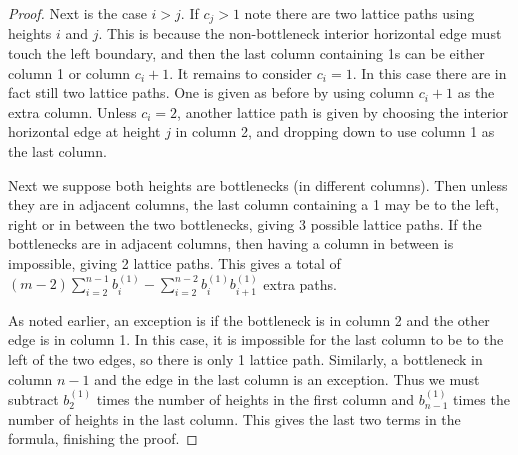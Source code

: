 \documentclass[12pt]{amsart}
\theoremstyle{definition}
\begin{document}
\begin{proof}
Next is the case $i>j$. If $c_j > 1$ note there are two lattice paths using heights $i$ and $j$. This is because the non-bottleneck interior horizontal edge must touch the left boundary, and then the last column containing 1s can be either column 1 or column $c_i+1$. It remains to consider $c_i=1$. In this case there are in fact still two lattice paths. One is given as before by using column $c_i+1$ as the extra column. Unless $c_i=2$, another lattice path is given by choosing the interior horizontal edge at height $j$ in column 2, and dropping down to use column 1 as the last column.

Next we suppose both heights are bottlenecks (in different columns). Then unless they are in adjacent columns, the last column containing a 1 may be to the left, right or in between the two bottlenecks, giving 3 possible lattice paths. If the bottlenecks are in adjacent columns, then having a column in between is impossible, giving 2 lattice paths. This gives a total of $(m-2)\sum_{i=2}^{n-1} b_i^{(1)} - \sum_{i=2}^{n-2} b_i^{(1)}b_{i+1}^{(1)}$ extra paths.  

As noted earlier, an exception is if the bottleneck is in column 2 and the other edge is in column 1. In this case, it is impossible for the last column to be to the left of the two edges, so there is only 1 lattice path. Similarly, a bottleneck in column $n-1$ and the edge in the last column is an exception. Thus we must subtract $b_2^{(1)}$ times the number of heights in the first column and $b_{n-1}^{(1)}$ times the number of heights in the last column. This gives the last two terms in the formula, finishing the proof. 
\end{proof}
\end{document}
